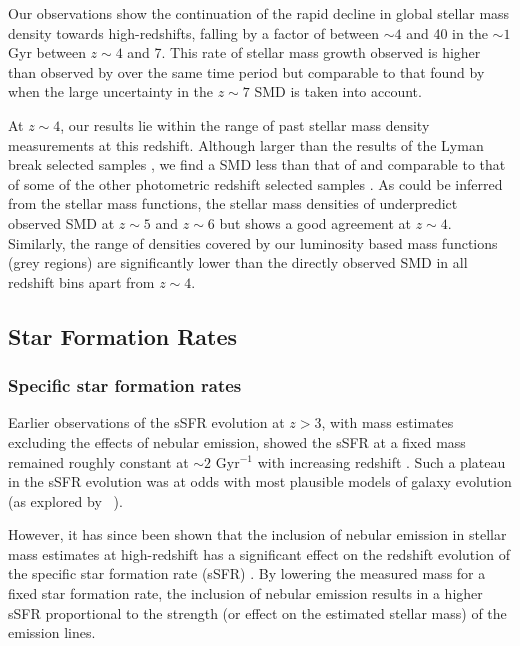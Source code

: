 Our observations show the continuation of the rapid decline in global stellar mass density towards high-redshifts, falling by a factor of between $\sim 4$ and 40 in the $\sim 1$ Gyr between $z \sim 4$ and 7. This rate of stellar mass growth observed is higher than observed by \citet{Gonzalez:2011dn} over the same time period but comparable to that found by \citet{Stark:2013ix} when the large uncertainty in the $z\sim7$ SMD is taken into account.

At $z \sim 4$, our results lie within the range of past stellar mass density measurements at this redshift. Although larger than the results of the Lyman break selected samples \citep{Gonzalez:2011dn,2012ApJ...752...66L,Stark:2013ix}, we find a SMD less than that of \citet{Santini:2012jq} and comparable to that of some of the other photometric redshift selected samples \citep{PerezGonzalez:2008cq,Marchesini:2009ef}. As could be inferred from the stellar mass functions, the stellar mass densities of \citet{Dave:2013bf} underpredict observed SMD at $z \sim 5$ and $z \sim 6$ but shows a good agreement at $z \sim 4$. Similarly, the range of densities covered by our luminosity based mass functions (grey regions) are significantly lower than the directly observed SMD in all redshift bins apart from $z\sim4$. 

\subsection{Star Formation Rates}
\subsubsection{Specific star formation rates}
Earlier observations of the sSFR evolution at $z > 3$, with mass estimates excluding the effects of nebular emission, showed the sSFR at a fixed mass remained roughly constant at $\sim 2$ Gyr$^{-1}$ with increasing redshift \citep{2009ApJ...697.1493S,Gonzalez:2010hm,2012ApJ...754...83B}. Such a plateau in the sSFR evolution was at odds with most plausible models of galaxy evolution (as explored by \citeauthor{Weinmann:2011hh}~\citeyear{Weinmann:2011hh}).

However, it has since been shown that the inclusion of nebular emission in stellar mass estimates at high-redshift has a significant effect on the redshift evolution of the specific star formation rate (sSFR) \citep{2009A&A...502..423S,2010A&A...515A..73S,Stark:2013ix,Gonzalez:2014do}. By lowering the measured mass for a fixed star formation rate, the inclusion of nebular emission results in a higher sSFR proportional to the strength (or effect on the estimated stellar mass) of the emission lines.


